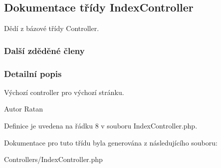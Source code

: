 \hypertarget{class_index_controller}{\subsection{Dokumentace třídy Index\-Controller}
\label{class_index_controller}
}


Dědí z bázové třídy Controller.

\subsubsection*{Další zděděné členy}


\subsubsection{Detailní popis}
Výchozí controller pro výchozí stránku. \begin{DoxyAuthor}{Autor}
Ratan 
\end{DoxyAuthor}


Definice je uvedena na řádku 8 v souboru Index\-Controller.\-php.



Dokumentace pro tuto třídu byla generována z následujícího souboru\-:\begin{DoxyCompactItemize}
\item 
Controllers/Index\-Controller.\-php\end{DoxyCompactItemize}

